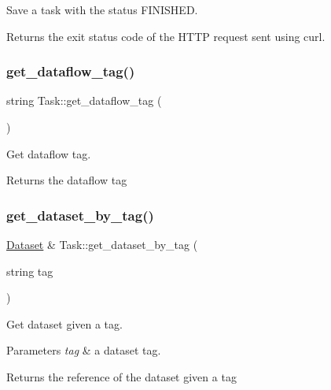 Save a task with the status F\+I\+N\+I\+S\+H\+ED. \begin{DoxyReturn}{Returns}
the exit status code of the H\+T\+TP request sent using curl. 
\end{DoxyReturn}
\mbox{\label{classTask_a7ec0e1dbe84fcb2fd338d29efe22012f}} 
\subsubsection{\texorpdfstring{get\+\_\+dataflow\+\_\+tag()}{get\_dataflow\_tag()}}
{\footnotesize\ttfamily string Task\+::get\+\_\+dataflow\+\_\+tag (\begin{DoxyParamCaption}{ }\end{DoxyParamCaption})}

Get dataflow tag. \begin{DoxyReturn}{Returns}
the dataflow tag 
\end{DoxyReturn}
\mbox{\label{classTask_af540b03cc9ed9910200895bbc080e911}} 
\subsubsection{\texorpdfstring{get\+\_\+dataset\+\_\+by\+\_\+tag()}{get\_dataset\_by\_tag()}}
{\footnotesize\ttfamily \hyperlink{classDataset}{Dataset} \& Task\+::get\+\_\+dataset\+\_\+by\+\_\+tag (\begin{DoxyParamCaption}\item[{string}]{tag }\end{DoxyParamCaption})}

Get dataset given a tag. 
\begin{DoxyParams}{Parameters}
{\em tag} & a dataset tag. \\
\hline
\end{DoxyParams}
\begin{DoxyReturn}{Returns}
the reference of the dataset given a tag 
\end{DoxyReturn}
\mbox{\label{classTask_ae69363e2ebfc402468ea97d29c89653a}} 

